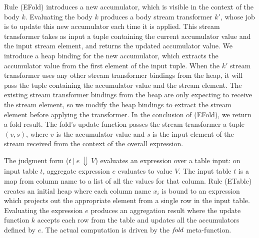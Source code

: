 
Rule (EFold) introduces a new accumulator, which is visible in the context of the body $k$.
Evaluating the body $k$ produces a body stream transformer $k'$, whose job is to update this new accumulator each time it is applied.
This stream transformer takes as input a tuple containing the current accumulator value and the input stream element, and returns the updated accumulator value.
We introduce a heap binding for the new accumulator, which extracts the accumulator value from the first element of the input tuple.
When the $k'$ stream transformer uses any other stream transformer bindings from the heap, it will pass the tuple containing the accumulator value and the stream element.
The existing stream transformer bindings from the heap are only expecting to receive the stream element, so we modify the heap bindings to extract the stream element before applying the transformer.
In the conclusion of (EFold), we return a fold result.
The fold's update function passes the stream transformer a tuple $(v, s)$, where $v$ is the accumulator value and $s$ is the input element of the stream received from the context of the overall \Ic@fold@ expression.

The judgment form ($t~|~e~\Downarrow~V$) evaluates an expression over a table input: on input table $t$, aggregate expression $e$ evaluates to value $V$.
The input table $t$ is a map from column name to a list of all the values for that column.
Rule (ETable) creates an initial heap where each column name $x_i$ is bound to an expression which projects out the appropriate element from a single row in the input table. Evaluating the expression $e$ produces an aggregation result where the update function $k$ accepts each row from the table and updates all the accumulators defined by $e$. The actual computation is driven by the $\mathit{fold}$ meta-function.


